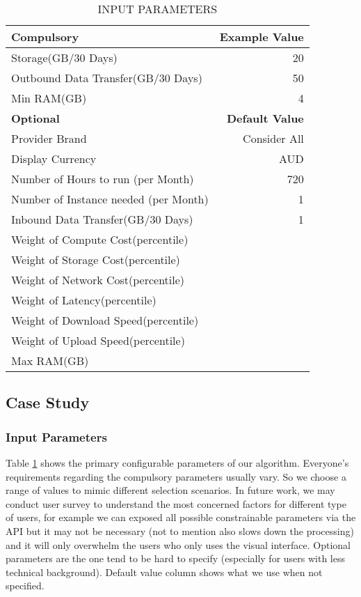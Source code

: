 \documentclass[journal]{IEEEtran}
\begin{document}
\begin{table}[!h]
\begin{center}\caption{INPUT PARAMETERS } \label{table:input_param}
\begin{tabular}{|l|r|}
\hline
\textbf{Compulsory }&  \textbf{Example Value } \\
\hline Storage(GB/30 Days) & 20 \\
\hline Outbound Data Transfer(GB/30 Days) & 50 \\
\hline Min RAM(GB) & 4 \\
\hline \textbf{Optional } & \textbf{Default Value} \\
\hline Provider Brand & Consider All \\
\hline Display Currency  & AUD \\

\hline Number of Hours to run (per Month) & 720 \\
\hline Number of Instance needed (per Month) & 1 \\
\hline Inbound Data Transfer(GB/30 Days) & 1  \\
\hline Weight of Compute Cost(percentile) &  \\
\hline Weight of Storage Cost(percentile) &  \\
\hline Weight of Network Cost(percentile) &  \\
\hline Weight of Latency(percentile) &  \\
\hline Weight of Download Speed(percentile) &  \\
\hline Weight of Upload Speed(percentile) &  \\
\hline Max RAM(GB) &  \\

\hline
\end{tabular}
\end{center}
\end{table}

\subsection{Case Study}
\subsubsection{ Input Parameters}
Table \ref{table:input_param} shows the primary configurable parameters of our algorithm. Everyone's requirements regarding the compulsory parameters usually vary. So we choose a range of values to mimic different selection scenarios. In future work, we may conduct user survey to understand the most concerned factors for different type of users, for example we can exposed all possible constrainable parameters via the API but it may not be necessary (not to mention also slows down the processing) and it will only overwhelm the users who only uses the visual interface. Optional parameters are the one tend to be hard to specify (especially for users with less technical background). Default value column shows what we use when not specified.
\end{document}
